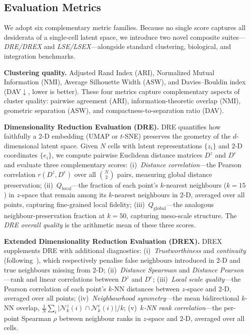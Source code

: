 \documentclass[biology,article,submit,pdftex]{Definitions/mdpi}
\begin{document}
\subsection{Evaluation Metrics}
\label{sec:experiments:metrics}

We adopt six complementary metric families. Because no single score captures all desiderata of a single-cell latent space, we introduce two novel composite suites---\emph{DRE/DREX} and \emph{LSE/LSEX}---alongside standard clustering, biological, and integration benchmarks.

\textbf{Clustering quality.} Adjusted Rand Index (ARI), Normalized Mutual Information (NMI), Average Silhouette Width (ASW), and Davies--Bouldin index (DAV$\downarrow$, lower is better). These four metrics capture complementary aspects of cluster quality: pairwise agreement (ARI), information-theoretic overlap (NMI), geometric separation (ASW), and compactness-to-separation ratio (DAV).

\textbf{Dimensionality Reduction Evaluation (DRE).}
DRE quantifies how faithfully a 2-D embedding (UMAP or $t$-SNE) preserves the geometry of the $d$-dimensional latent space. Given $N$ cells with latent representations $\{z_i\}$ and 2-D coordinates $\{e_i\}$, we compute pairwise Euclidean distance matrices $D^{z}$ and $D^{e}$ and evaluate three complementary scores:
(i)~\emph{Distance correlation}---the Pearson correlation $r(D^{z}, D^{e})$ over all $\binom{N}{2}$ pairs, measuring global distance preservation;
(ii)~$Q_{\mathrm{local}}$---the fraction of each point's $k$-nearest neighbours ($k{=}15$) in $z$-space that remain among its $k$-nearest neighbours in 2-D, averaged over all points, capturing fine-grained local fidelity;
(iii)~$Q_{\mathrm{global}}$---the analogous neighbour-preservation fraction at $k{=}50$, capturing meso-scale structure.
The \emph{DRE overall quality} is the arithmetic mean of these three scores.

\textbf{Extended Dimensionality Reduction Evaluation (DREX).}
DREX supplements DRE with additional diagnostics:
(i)~\emph{Trustworthiness} and \emph{continuity} (following~\cite{venna2006local}), which respectively penalise false neighbours introduced in 2-D and true neighbours missing from 2-D;
(ii)~\emph{Distance Spearman} and \emph{Distance Pearson}---rank and linear correlations between $D^{z}$ and $D^{e}$;
(iii)~\emph{Local scale quality}---the Pearson correlation of each point's $k$-NN distances between $z$-space and 2-D, averaged over all points;
(iv)~\emph{Neighbourhood symmetry}---the mean bidirectional $k$-NN overlap, $\frac{1}{N}\sum_{i}\lvert\mathcal{N}^{z}_{k}(i)\cap\mathcal{N}^{e}_{k}(i)\rvert / k$;
(v)~\emph{$k$-NN rank correlation}---the per-point Spearman $\rho$ between neighbour ranks in $z$-space and 2-D, averaged over all cells.
\end{document}
